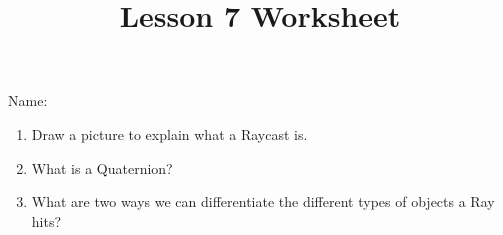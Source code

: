 \documentclass[12pt]{../rhitcsse}
\title{Lesson 7 Worksheet}
\begin{document}
\maketitle

\vspace*{0.15in}\hspace{0.25in}Name:\hrulefill\hspace{0.25in}\hspace{0.25in}

\begin{enumerate}worksheets/ws6.tex
  \item Draw a picture to explain what a Raycast is.
  \vfill
  \item What is a Quaternion?
  \vfill
  \item What are two ways we can differentiate the different types of objects a Ray hits?
  \vfill


\end{enumerate}
\end{document}

